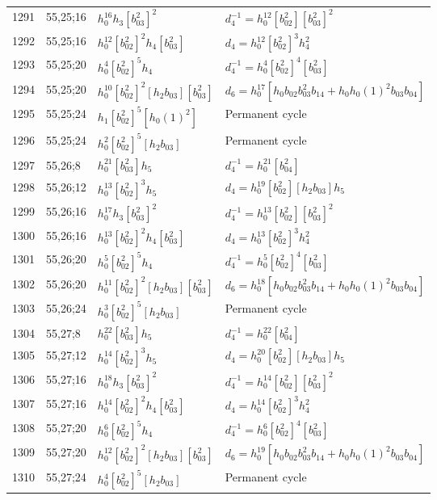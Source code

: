 \documentclass{article}
\begin{document}
\begin{longtable}{|l|l|>{\raggedright\arraybackslash}p{6cm}|>{\raggedright\arraybackslash}p{6cm}|}
\hline
1291 & 55,25;16 & $h_0^{16}h_3[b_{03}^2]^2$ & $d_{4}^{-1}=h_0^{12}[b_{02}^2][b_{03}^2]^2$\\
1292 & 55,25;16 & $h_0^{12}[b_{02}^2]^2h_4[b_{03}^2]$ &$d_{4}=h_0^{12}[b_{02}^2]^3h_4^2$\\
\hline
1293 & 55,25;20 & $h_0^4[b_{02}^2]^5h_4$ & $d_{4}^{-1}=h_0^4[b_{02}^2]^4[b_{03}^2]$\\
1294 & 55,25;20 & $h_0^{10}[b_{02}^2]^2[h_2b_{03}][b_{03}^2]$ &$d_{6}=h_0^{17}[h_0b_{02}b_{03}^2b_{14} + h_0h_0(1)^2b_{03}b_{04}]$\\
\hline
1295 & 55,25;24 & $h_1[b_{02}^2]^5[h_0(1)^2]$ & Permanent cycle\\
1296 & 55,25;24 & $h_0^2[b_{02}^2]^5[h_2b_{03}]$ & Permanent cycle\\
\hline
1297 & 55,26;8 & $h_0^{21}[b_{03}^2]h_5$ & $d_{4}^{-1}=h_0^{21}[b_{04}^2]$\\
\hline
1298 & 55,26;12 & $h_0^{13}[b_{02}^2]^3h_5$ &$d_{4}=h_0^{19}[b_{02}^2][h_2b_{03}]h_5$\\
\hline
1299 & 55,26;16 & $h_0^{17}h_3[b_{03}^2]^2$ & $d_{4}^{-1}=h_0^{13}[b_{02}^2][b_{03}^2]^2$\\
1300 & 55,26;16 & $h_0^{13}[b_{02}^2]^2h_4[b_{03}^2]$ &$d_{4}=h_0^{13}[b_{02}^2]^3h_4^2$\\
\hline
1301 & 55,26;20 & $h_0^5[b_{02}^2]^5h_4$ & $d_{4}^{-1}=h_0^5[b_{02}^2]^4[b_{03}^2]$\\
1302 & 55,26;20 & $h_0^{11}[b_{02}^2]^2[h_2b_{03}][b_{03}^2]$ &$d_{6}=h_0^{18}[h_0b_{02}b_{03}^2b_{14} + h_0h_0(1)^2b_{03}b_{04}]$\\
\hline
1303 & 55,26;24 & $h_0^3[b_{02}^2]^5[h_2b_{03}]$ & Permanent cycle\\
\hline
1304 & 55,27;8 & $h_0^{22}[b_{03}^2]h_5$ & $d_{4}^{-1}=h_0^{22}[b_{04}^2]$\\
\hline
1305 & 55,27;12 & $h_0^{14}[b_{02}^2]^3h_5$ &$d_{4}=h_0^{20}[b_{02}^2][h_2b_{03}]h_5$\\
\hline
1306 & 55,27;16 & $h_0^{18}h_3[b_{03}^2]^2$ & $d_{4}^{-1}=h_0^{14}[b_{02}^2][b_{03}^2]^2$\\
1307 & 55,27;16 & $h_0^{14}[b_{02}^2]^2h_4[b_{03}^2]$ &$d_{4}=h_0^{14}[b_{02}^2]^3h_4^2$\\
\hline
1308 & 55,27;20 & $h_0^6[b_{02}^2]^5h_4$ & $d_{4}^{-1}=h_0^6[b_{02}^2]^4[b_{03}^2]$\\
1309 & 55,27;20 & $h_0^{12}[b_{02}^2]^2[h_2b_{03}][b_{03}^2]$ &$d_{6}=h_0^{19}[h_0b_{02}b_{03}^2b_{14} + h_0h_0(1)^2b_{03}b_{04}]$\\
\hline
1310 & 55,27;24 & $h_0^4[b_{02}^2]^5[h_2b_{03}]$ & Permanent cycle\\

\end{longtable}
\end{document}
